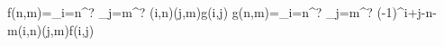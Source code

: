 f(n,m)=\sum_{i=n}^? \sum_{j=m}^? (i,n)(j,m)g(i,j) \iff g(n,m)=\sum_{i=n}^? \sum_{j=m}^? (-1)^{i+j-n-m}(i,n)(j,m)f(i,j)
